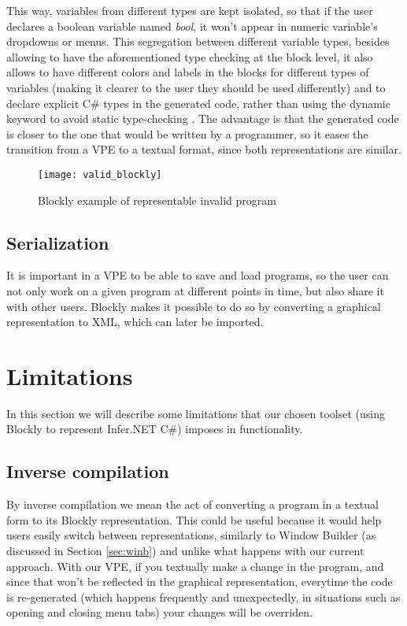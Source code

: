 This way, variables from different types are kept isolated, so that if the user
declares a boolean variable named \textit{bool}, it won't appear in numeric
variable's dropdowns or menus. This segregation between different variable types,
besides allowing to have the aforementioned type checking at the block level, it
also allows to have different colors and labels in the blocks for different types of variables
(making it clearer to the user they should be used differently) and to declare
explicit C# types in the generated code, rather than using
the dynamic keyword to avoid static type-checking \cite{cdyn}. The advantage is that
the generated code is closer to the one that would be written by a programmer,
so it eases the transition from a VPE to a textual format, since both representations
are similar.

\begin{figure}[t]
  \begin{center}
    \leavevmode
    \texttt{[image: valid\_blockly]}
    \caption{Blockly example of representable invalid program}
    \label{fig:valid_blockly}
  \end{center}
\end{figure}

\subsection{Serialization}

It is important in a VPE to be able to save and load programs, so the user can
not only work on a given program at different points in time, but also share it
with other users. Blockly makes it possible to do so by converting a graphical
representation to XML, which can later be imported.

\section{Limitations}

In this section we will describe some limitations that our chosen toolset (using
Blockly to represent Infer.NET C#) imposes in functionality.

\subsection{Inverse compilation}

By inverse compilation we mean the act of converting a program in a textual form
to its Blockly representation. This could be useful because it would help users
easily switch between representations, similarly to Window Builder (as discussed in Section \ref{sec:winb})
and unlike what happens with our current approach.
With our VPE, if you textually make a change in the program,
and since that won't be reflected in the graphical representation, everytime
the code is re-generated (which happens frequently and unexpectedly, in situations
such as opening and closing menu tabs) your changes will be overriden.

